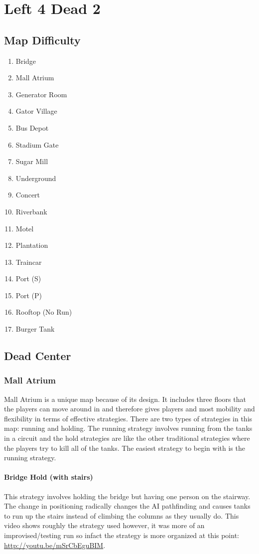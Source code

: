 \chapter{Left 4 Dead 2}

\section{Map Difficulty}

\begin{enumerate}
\item Bridge
\item Mall Atrium
\item Generator Room
\item Gator Village
\item Bus Depot
\item Stadium Gate
\item Sugar Mill
\item Underground
\item Concert
\item Riverbank
\item Motel
\item Plantation
\item Traincar
\item Port (S)
\item Port (P)
\item Rooftop (No Run)
\item Burger Tank
\end{enumerate}

\section{Dead Center}

\subsection{Mall Atrium}
Mall Atrium is a unique map because of its design. It includes three floors that the players can move around in and therefore gives players and most mobility and flexibility in terms of effective strategies. There are two types of strategies in this map: running and holding. The running strategy involves running from the tanks in a circuit and the hold strategies are like the other traditional strategies where the players try to kill all of the tanks. The easiest strategy to begin with is the running strategy.

\subsubsection{Bridge Hold (with stairs)}
This strategy involves holding the bridge but having one person on the stairway. The change in positioning radically changes the AI pathfinding and causes tanks to run up the stairs instead of climbing the columns as they usually do. This video shows roughly the strategy used however, it was more of an improvised/testing run so infact the strategy is more organized at this point: \url{http://youtu.be/mSrCbEguBIM}.

